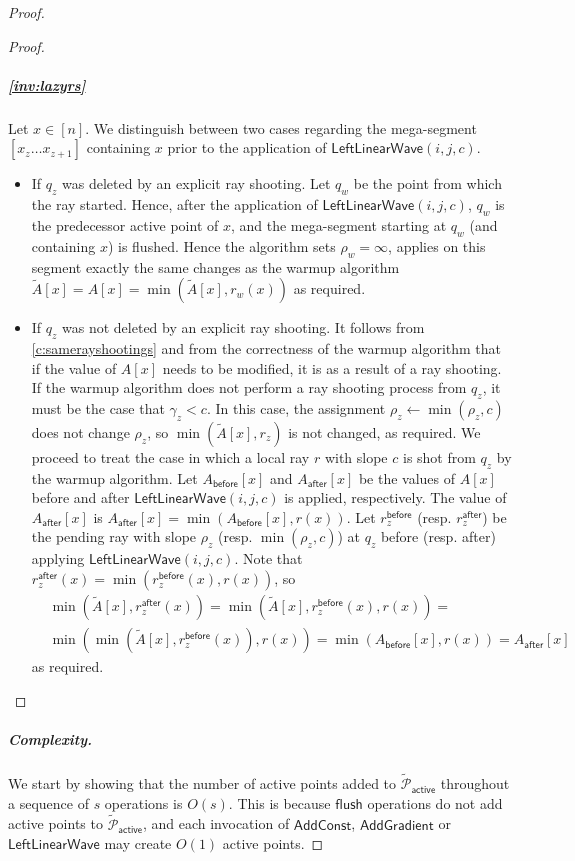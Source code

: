 \documentclass[10pt,a4paper]{article}
\newcommand{\AC}{\mathsf{AddConst}}
\newcommand{\AG}{\mathsf{AddGradient}}
\newcommand{\LLW}{\mathsf{LeftLinearWave}}
\newcommand{\assign}{\leftarrow}
\newcommand{\local}{\text{short }}
\newcommand{\longrange}{\text{long }}
\renewcommand{\P}{\mathcal{P}}
\newcommand{\TAP}{\tilde{\P}_{\mathsf{active}}}
\newcommand{\TA}{\tilde{A}}
\newcommand{\para}[1]{\vspace{-0.1in} \subparagraph*{#1}}
\newcommand{\ray}{r}
\newcommand{\rl}[1]{\rho_{#1}}
\newcommand{\flush}{\mathsf{flush}}
\begin{document}
\begin{proof}
\begin{proof}
\para{\cref{inv:lazyrs}}
Let $x\in [n]$.
We distinguish between two cases regarding the mega-segment $[x_z \ldots x_{z+1}]$ containing $x$ prior to the application of $\LLW(i,j,c)$.
\begin{itemize}
    \item If $q_z$ was deleted by an explicit \longrange ray shooting.
    Let $q_w$ be the point from which the \longrange ray started. 
    Hence, after the application of $\LLW(i,j,c)$, $q_w$ is the predecessor active point of $x$, and the mega-segment starting at $q_w$ (and containing $x$) is flushed. Hence the algorithm sets $\rl{w} = \infty$, applies on this segment exactly the same changes as the warmup algorithm $\TA[x] = A[x] = \min(\TA[x], \ray_w(x))$ as required.
    \item If $q_z$ was not deleted by an explicit \longrange ray shooting. 
    It follows from \cref{c:samerayshootings} and from the correctness of the warmup algorithm that if the value of $A[x]$ needs to be modified, it is as a result of a \local ray shooting.
    If the warmup algorithm does not perform a ray shooting process from $q_z$, it must be the case that $\gamma_z  < c$.
    In this case, the assignment $\rl{z} \assign \min(\rl{z},c)$ does not change $\rl{z}$, so $\min(\TA[x],\ray_z)$ is not changed, as required.
    We proceed to treat the case in which a local ray $r$ with slope $c$ is shot from $q_z$ by the warmup algorithm.
    Let $A_{\mathsf{before}}[x]$ and $A_{\mathsf{after}}[x]$ be the values of $A[x]$ before and after $\LLW(i,j,c)$ is applied, respectively.
    The value of $A_{\mathsf{after}}[x]$ is $A_{\mathsf{after}}[x] = \min(A_{\mathsf{before}}[x], r(x))$.
    Let $\ray_{z}^{\mathsf{before}}$ (resp. $\ray_{z}^{\mathsf{after}}$) be the pending ray with slope $\rl{z}$ (resp. $\min(\rl{z},c)$) at $q_z$ before  (resp. after) applying $\LLW(i,j,c)$.
Note that $\ray_{z}^{\mathsf{after}}(x) = \min (\ray_{z}^{\mathsf{before}}(x), r(x))$, so
    \begin{align*}
        & \min(\TA[x] ,\ray_{z}^{\mathsf{after}}(x) ) = \min(\TA[x],\ray_{z}^{\mathsf{before}}(x), r(x)) = 
        \\
        & \min(\min(\TA[x],\ray_{z}^{\mathsf{before}}(x)),r(x)) =
        \min(A_{\mathsf{before}}[x] , r(x)) = A_{\mathsf{after}}[x]
    \end{align*}
    as required.\qedhere
\end{itemize}

\end{proof}

\para{Complexity.}
We start by showing that the number of active points added to $\TAP$ throughout a sequence of $s$ operations is $O(s)$.
This is because $\flush$ operations do not add active points to $\TAP$, and 
each invocation of $\AC$, $\AG$ or $\LLW$ may create $O(1)$ active points.


\end{proof}
\end{document}
